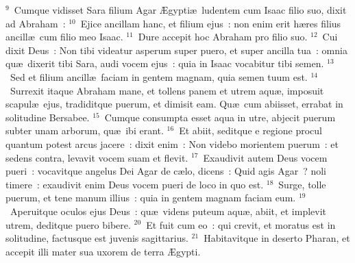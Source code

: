 ${}^{9}$~Cumque vidisset Sara filium Agar \AE gypti\ae\ ludentem cum Isaac filio suo, dixit ad Abraham~:
${}^{10}$~Ejice ancillam hanc, et filium ejus~: non enim erit h\ae res filius ancill\ae\ cum filio meo Isaac.
${}^{11}$~Dure accepit hoc Abraham pro filio suo.
${}^{12}$~Cui dixit Deus~: Non tibi videatur asperum super puero, et super ancilla tua~: omnia qu\ae\ dixerit tibi Sara, audi vocem ejus~: quia in Isaac vocabitur tibi semen.
${}^{13}$~Sed et filium ancill\ae\ faciam in gentem magnam, quia semen tuum est.
${}^{14}$~Surrexit itaque Abraham mane, et tollens panem et utrem aqu\ae , imposuit scapul\ae\ ejus, tradiditque puerum, et dimisit eam. Qu\ae\ cum abiisset, errabat in solitudine Bersabee.
${}^{15}$~Cumque consumpta esset aqua in utre, abjecit puerum subter unam arborum, qu\ae\ ibi erant.
${}^{16}$~Et abiit, seditque e regione procul quantum potest arcus jacere~: dixit enim~: Non videbo morientem puerum~: et sedens contra, levavit vocem suam et flevit.
${}^{17}$~Exaudivit autem Deus vocem pueri~: vocavitque angelus Dei Agar de c\ae lo, dicens~: Quid agis Agar~? noli timere~: exaudivit enim Deus vocem pueri de loco in quo est.
${}^{18}$~Surge, tolle puerum, et tene manum illius~: quia in gentem magnam faciam eum.
${}^{19}$~Aperuitque oculos ejus Deus~: qu\ae\ videns puteum aqu\ae , abiit, et implevit utrem, deditque puero bibere.
${}^{20}$~Et fuit cum eo~: qui crevit, et moratus est in solitudine, factusque est juvenis sagittarius.
${}^{21}$~Habitavitque in deserto Pharan, et accepit illi mater sua uxorem de terra \AE gypti.



